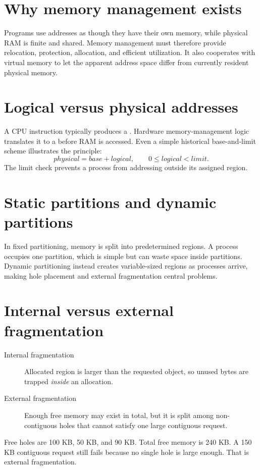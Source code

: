 \section{Why memory management exists}
Programs use addresses as though they have their own memory, while physical RAM is finite and shared. Memory management must therefore provide relocation, protection, allocation, and efficient utilization. It also cooperates with virtual memory to let the apparent address space differ from currently resident physical memory.

\section{Logical versus physical addresses}
A CPU instruction typically produces a . Hardware memory-management logic translates it to a  before RAM is accessed. Even a simple historical base-and-limit scheme illustrates the principle:
\[
physical = base + logical, \qquad 0 \le logical < limit.
\]
The limit check prevents a process from addressing outside its assigned region.

\section{Static partitions and dynamic partitions}
In fixed partitioning, memory is split into predetermined regions. A process occupies one partition, which is simple but can waste space inside partitions. Dynamic partitioning instead creates variable-sized regions as processes arrive, making hole placement and external fragmentation central problems.

\section{Internal versus external fragmentation}
\begin{description}
  \item[Internal fragmentation] Allocated region is larger than the requested object, so unused bytes are trapped \emph{inside} an allocation.
  \item[External fragmentation] Enough free memory may exist in total, but it is split among non-contiguous holes that cannot satisfy one large contiguous request.
\end{description}

\begin{workedexample}
Free holes are 100 KB, 50 KB, and 90 KB. Total free memory is 240 KB. A 150 KB contiguous request still fails because no single hole is large enough. That is external fragmentation.
\end{workedexample}

